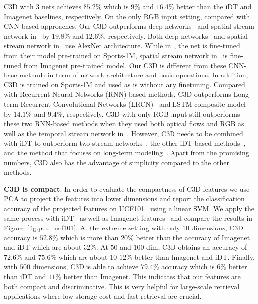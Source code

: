 \documentclass[10pt,twocolumn,letterpaper]{article}
\begin{document}
C3D with $3$ nets achieves $85.2\%$ which is $9\%$ and $16.4\%$ better than the iDT and Imagenet baselines, respectively. On the only RGB input setting, compared with CNN-based approaches, Our C3D outperforms deep networks~\cite{Karpathy14} and spatial stream network in~\cite{SimonyanZ14} by $19.8\%$ and $12.6\%$, respectively. Both deep networks~\cite{Karpathy14} and spatial stream network in~\cite{SimonyanZ14} use AlexNet architecture. While in~\cite{Karpathy14}, the net is fine-tuned from their model pre-trained on Sports-1M, spatial stream network in~\cite{SimonyanZ14} is fine-tuned from Imagenet pre-trained model. Our C3D is different from these CNN-base methods in term of network architecture and basic operations. In addition, C3D is trained on Sports-1M and used as is without any finetuning. Compared with Recurrent Neural Networks (RNN) based methods, C3D outperforms Long-term Recurrent Convolutional Networks (LRCN)~\cite{DonahueHGRVSD14} and LSTM composite model~\cite{SrivastavaMS15} by $14.1\%$ and $9.4\%$, respectively. C3D with only RGB input still outperforms these two RNN-based methods when they used both optical flows and RGB as well as the temporal stream network in~\cite{SimonyanZ14}. However, C3D needs to be combined with iDT to outperform two-stream networks~\cite{SimonyanZ14}, the other iDT-based methods~\cite{PengWWQ14,LanLLHR14}, and the method that focuses on long-term modeling~\cite{Ng15}. Apart from the promising numbers, C3D also has the advantage of simplicity compared to the other methods.


{\bf C3D is compact}: In order to evaluate the compactness of C3D features we use PCA to project the features into lower dimensions and report the classification accuracy of the projected features on UCF101~\cite{UCF101} using a linear SVM. We apply the same process with iDT~\cite{Wang2013} as well as Imagenet features~\cite{Donahue13} and compare the results in Figure~\ref{fig:pca_ucf101}. At the extreme setting with only $10$ dimensions, C3D accuracy is $52.8\%$ which is more than $20\%$ better than the accuracy of Imagenet and iDT which are about $32\%$. At $50$ and $100$ dim, C3D obtains an accuracy of $72.6\%$ and $75.6\%$ which are about $10$-$12\%$ better than Imagenet and iDT. Finally, with $500$ dimensions, C3D is able to achieve $79.4\%$ accuracy which is $6\%$ better than iDT and $11\%$ better than Imagenet. This indicates that our features are both compact and discriminative. This is very helpful for large-scale retrieval applications where low storage cost and fast retrieval are crucial.
\end{document}
